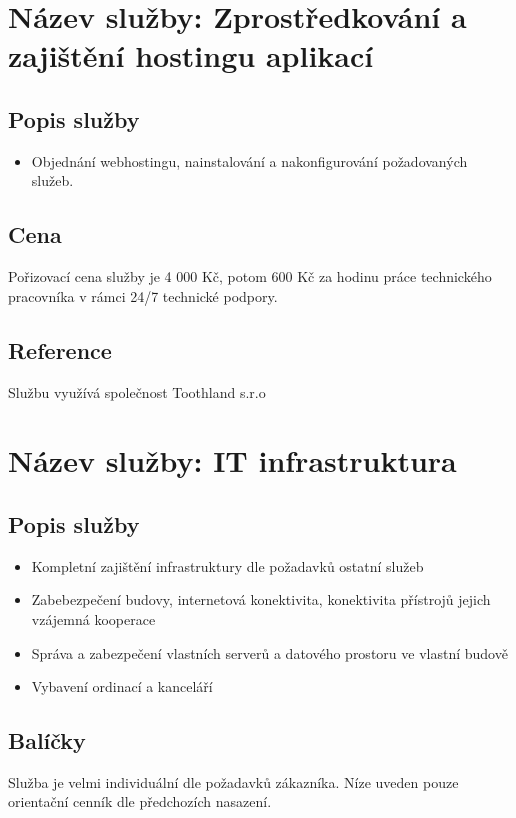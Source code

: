 \documentclass[12pt, a4paper, titlepage]{article}
\begin{document}
	\section*{Název služby: Zprostředkování a zajištění hostingu aplikací}	
	\vspace{1em}
	\subsection*{Popis služby}
	\begin{itemize}
		\item Objednání webhostingu, nainstalování a nakonfigurování požadovaných služeb.
	\end{itemize}

	\subsection*{Cena}
	Pořizovací cena služby je 4 000 Kč, potom 600 Kč za hodinu práce technického pracovníka v rámci 24/7 technické podpory.

	\subsection*{Reference}
	Službu využívá společnost Toothland s.r.o

	\noindent\makebox[\linewidth]{\rule{16cm}{0.4pt}}

	\section*{Název služby: IT infrastruktura}

	\subsection*{Popis služby}
	\begin{itemize}
		\item Kompletní zajištění infrastruktury dle požadavků ostatní služeb
		\item Zabebezpečení budovy, internetová konektivita, konektivita přístrojů jejich vzájemná kooperace
		\item Správa a zabezpečení vlastních serverů a datového prostoru ve vlastní budově
		\item Vybavení ordinací a kanceláří
	\end{itemize}

	\subsection*{Balíčky}
	Služba je velmi individuální dle požadavků zákazníka. Níze uveden pouze orientační cenník dle předchozích nasazení. 
\end{document}
